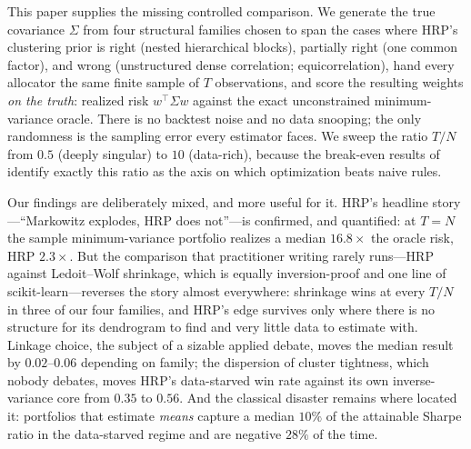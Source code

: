 \documentclass[11pt]{article}
\newcommand{\Sig}{\Sigma}
\newcommand{\TN}{T/N}
\begin{document}
This paper supplies the missing controlled comparison. We generate the true
covariance $\Sig$ from four structural families chosen to span the cases
where HRP's clustering prior is right (nested hierarchical blocks), partially
right (one common factor), and wrong (unstructured dense correlation;
equicorrelation), hand every allocator the same finite sample of $T$
observations, and score the resulting weights \emph{on the truth}: realized
risk $w^{\top}\Sig w$ against the exact unconstrained minimum-variance
oracle. There is no backtest noise and no data snooping; the only randomness
is the sampling error every estimator faces. We sweep the ratio $\TN$ from
$0.5$ (deeply singular) to $10$ (data-rich), because the
break-even results of \citet{demiguel2009optimal} identify exactly this
ratio as the axis on which optimization beats naive rules.

Our findings are deliberately mixed, and more useful for it. HRP's headline
story---``Markowitz explodes, HRP does not''---is confirmed, and
quantified: at $T=N$ the sample minimum-variance portfolio realizes a median
$16.8\times$ the oracle risk, HRP $2.3\times$. But the comparison that
practitioner writing rarely runs---HRP against Ledoit--Wolf shrinkage, which
is equally inversion-proof and one line of scikit-learn---reverses the
story almost everywhere: shrinkage wins at every $\TN$ in three of our four
families, and HRP's edge survives only where there is no structure for its
dendrogram to find and very little data to estimate with. Linkage choice,
the subject of a sizable applied debate, moves the median result by
$0.02$--$0.06$ depending on family; the dispersion of cluster tightness,
which nobody debates, moves HRP's data-starved win rate against its own
inverse-variance core from $0.35$ to $0.56$.
And the classical disaster remains where \citet{demiguel2009optimal} located
it: portfolios that estimate \emph{means} capture a median $10\%$ of the
attainable Sharpe ratio in the data-starved regime and are negative $28\%$
of the time.
\end{document}
